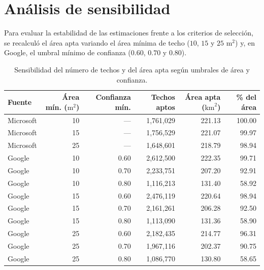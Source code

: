 \section{Análisis de sensibilidad}\label{sec:sensibilidad}
Para evaluar la estabilidad de las estimaciones frente a los criterios de selección, se recalculó el área apta variando el área mínima de techo ($10$, $15$ y $25\text{ m}^2$) y, en Google, el umbral mínimo de confianza ($0.60$, $0.70$ y $0.80$).

\begin{table}[H]
\centering
\small
{}
\begin{tabular}{lrrrrr}
\toprule
\textbf{Fuente} & \textbf{Área mín. ($\text{m}^2$)} & \textbf{Confianza mín.} & \textbf{Techos aptos} & \textbf{Área apta ($\text{km}^2$)} & \textbf{\% del área} \\
\midrule
Microsoft & 10 & --- & 1{,}761{,}029 & 221.13 & 100.00 \\
Microsoft & 15 & --- & 1{,}756{,}529 & 221.07 & 99.97 \\
Microsoft & 25 & --- & 1{,}648{,}601 & 218.79 & 98.94 \\
\midrule
Google & 10 & 0.60 & 2{,}612{,}500 & 222.35 & 99.71 \\
Google & 10 & 0.70 & 2{,}233{,}751 & 207.20 & 92.91 \\
Google & 10 & 0.80 & 1{,}116{,}213 & 131.40 & 58.92 \\
Google & 15 & 0.60 & 2{,}476{,}119 & 220.64 & 98.94 \\
Google & 15 & 0.70 & 2{,}161{,}261 & 206.28 & 92.50 \\
Google & 15 & 0.80 & 1{,}113{,}090 & 131.36 & 58.90 \\
Google & 25 & 0.60 & 2{,}182{,}435 & 214.77 & 96.31 \\
Google & 25 & 0.70 & 1{,}967{,}116 & 202.37 & 90.75 \\
Google & 25 & 0.80 & 1{,}086{,}770 & 130.80 & 58.65 \\
\bottomrule
\end{tabular}
\caption{Sensibilidad del número de techos y del área apta según umbrales de área y confianza.}
\label{tab:sensibilidad}
\end{table}

